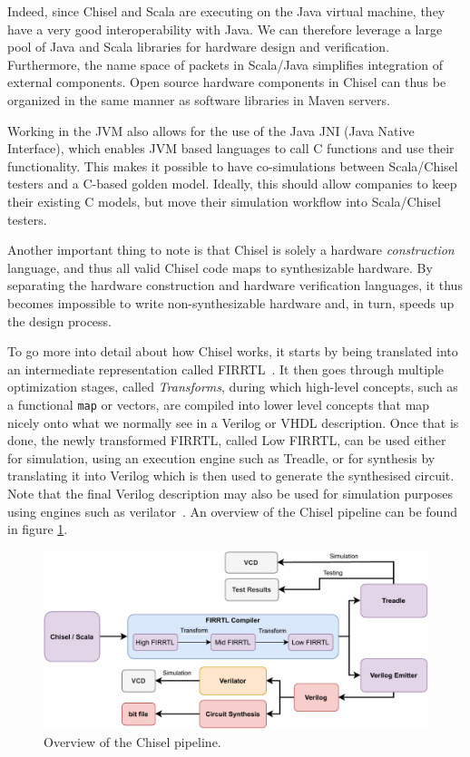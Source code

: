 \documentclass[conference]{IEEEtran}
\begin{document}
Indeed, since Chisel and Scala are executing on the Java virtual machine, they have a very good interoperability with Java. 
We can therefore leverage a large pool of Java and Scala libraries for hardware design and verification. 
Furthermore, the name space of packets in Scala/Java simplifies integration of external components.
Open source hardware components in Chisel can thus be organized in the same manner as software libraries in Maven servers.

Working in the JVM also allows for the use of the Java JNI (Java Native Interface), which enables JVM based languages to call C functions and use their functionality.
This makes it possible to have co-simulations between Scala/Chisel testers and a C-based golden model. 
Ideally, this should allow companies to keep their existing C models, but move their simulation workflow into Scala/Chisel testers.

Another important thing to note is that Chisel is solely a hardware \emph{construction} language, and thus all valid Chisel code maps to synthesizable hardware.
By separating the hardware construction and hardware verification languages, it thus becomes impossible to write non-synthesizable hardware and, in turn, speeds up the design process.

To go more into detail about how Chisel works, it starts by being translated into an intermediate representation called FIRRTL~\cite{firrtl}. It then goes through multiple optimization stages, called \textit{Transforms}, during which high-level concepts, such as a functional \texttt{map} or vectors, are compiled into lower level concepts that map nicely onto what we normally see in a Verilog or VHDL description. Once that is done, the newly transformed FIRRTL, called Low FIRRTL, can be used either for simulation, using an execution engine such as Treadle, or for synthesis by translating it into Verilog which is then used to generate the synthesised circuit. Note that the final Verilog description may also be used for simulation purposes using engines such as verilator~\cite{verilator}. An overview of the Chisel pipeline can be found in figure \ref{fig:chisel-pipe}.

\begin{figure}
  \centering
    \includegraphics[width=0.8\linewidth]{Chisel_FIRRTL_VERILOG.pdf}
    \caption{Overview of the Chisel pipeline.}
\label{fig:chisel-pipe}
\end{figure}
\end{document}
